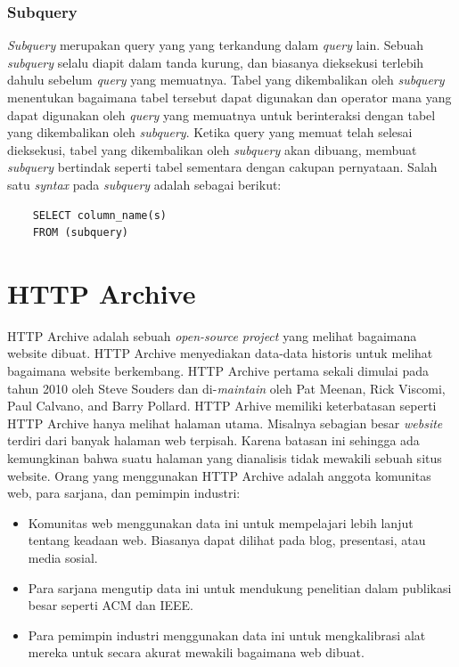 \subsubsection{Subquery}
\textit{Subquery} merupakan query yang yang terkandung dalam \textit{query} lain. Sebuah \textit{subquery} selalu diapit dalam tanda kurung, dan biasanya dieksekusi terlebih dahulu sebelum \textit{query} yang memuatnya. Tabel yang dikembalikan oleh \textit{subquery} menentukan bagaimana tabel tersebut dapat digunakan dan operator mana yang dapat digunakan oleh \textit{query} yang memuatnya untuk berinteraksi dengan tabel yang dikembalikan oleh \textit{subquery}. Ketika query yang memuat telah selesai dieksekusi, tabel yang dikembalikan oleh \textit{subquery} akan dibuang, membuat \textit{subquery} bertindak seperti tabel sementara dengan cakupan pernyataan. Salah satu \textit{syntax} pada \textit{subquery} adalah sebagai berikut:
\begin{verbatim}
	SELECT column_name(s)
	FROM (subquery)
\end{verbatim}


\section{HTTP Archive \cite{httparchiveAbout}}
HTTP Archive adalah sebuah \textit{open-source project} yang melihat bagaimana website dibuat. HTTP Archive menyediakan data-data historis untuk melihat bagaimana website berkembang. HTTP Archive pertama sekali dimulai pada tahun 2010 oleh Steve Souders dan di-\textit{maintain} oleh Pat Meenan, Rick Viscomi, Paul Calvano, and Barry Pollard. HTTP Arhive memiliki keterbatasan seperti HTTP Archive hanya melihat halaman utama. Misalnya sebagian besar \textit{website} terdiri dari banyak halaman web terpisah. Karena batasan ini sehingga ada kemungkinan bahwa suatu halaman yang dianalisis tidak mewakili sebuah situs website. Orang yang menggunakan HTTP Archive adalah anggota komunitas web, para sarjana, dan pemimpin industri:
\begin{itemize}
	\item Komunitas web menggunakan data ini untuk mempelajari lebih lanjut tentang keadaan web. Biasanya dapat dilihat pada blog, presentasi, atau media sosial. 
	\item Para sarjana mengutip data ini untuk mendukung penelitian dalam publikasi besar seperti ACM dan IEEE.
	\item Para pemimpin industri menggunakan data ini untuk mengkalibrasi alat mereka untuk secara akurat mewakili bagaimana web dibuat.
\end{itemize}


